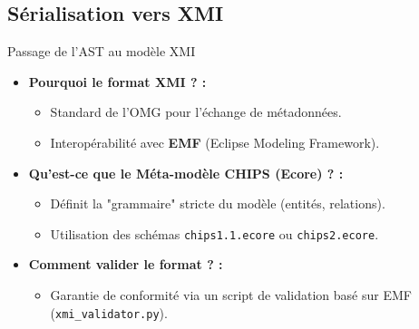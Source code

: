 \subsection{Sérialisation vers XMI}

\begin{frame}{Passage de l'AST au modèle XMI}
    \begin{itemize}
        \item \textbf{Pourquoi le format XMI ? :}
        \begin{itemize}
            \item Standard de l'OMG pour l'échange de métadonnées.
            \item Interopérabilité avec \textbf{EMF} (Eclipse Modeling Framework).
        \end{itemize}
        \vfill
        \item \textbf{Qu'est-ce que le Méta-modèle CHIPS (Ecore) ? :}
        \begin{itemize}
            \item Définit la "grammaire" stricte du modèle (entités, relations).
            \item Utilisation des schémas \texttt{chips1.1.ecore} ou \texttt{chips2.ecore}.
        \end{itemize}
        \vfill
        \item \textbf{Comment valider le format ? :}
        \begin{itemize}
            \item Garantie de conformité via un script de validation basé sur EMF (\texttt{xmi\_validator.py}).
        \end{itemize}
    \end{itemize}
\end{frame}

